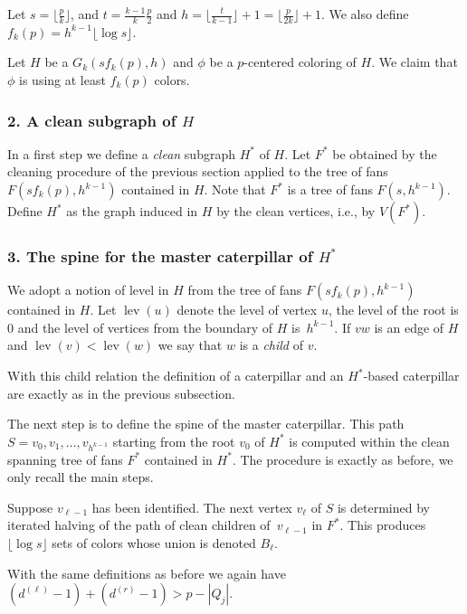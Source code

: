\documentclass[11pt]{article}
\begin{document}
\smallskip

Let $s=\lfloor \frac{p}{k} \rfloor$, and
$t =  \frac{k-1}{k}\frac{p}{2} $ and $h = \lfloor \frac{t}{k-1} \rfloor +1 =
\lfloor \frac{p}{2k} \rfloor +1$.  We also define 
$f_k(p) = h^{k-1} \lfloor\log s\rfloor$.

Let $H$ be a $G_k(s f_k(p), h)$ and $\phi$ be a $p$-centered coloring of
$H$. We claim that $\phi$ is using at least $f_k(p)$ colors.

\subsubsection*{2.  A clean subgraph of $H$}\hfill


In a first step we define a \emph{clean} subgraph $H^*$ of $H$. Let $F^*$ be
obtained by the cleaning procedure of the previous section applied to the tree
of fans $F(s f_k(p),h^{k-1})$ contained in $H$.  Note that $F^*$ is a
tree of fans $F(s,h^{k-1})$. Define $H^*$ as the graph
induced in $H$ by the clean vertices, i.e., by $V(F^*)$.


\subsubsection*{3.  The spine for the master caterpillar of $H^*$}\hfill

We adopt a notion of level in $H$ from the tree of fans
$F(s f_k(p),h^{k-1})$ contained in $H$. Let $\operatorname{lev}(u)$ denote the level of
vertex $u$, the level of the root is 0 and the level of vertices from the
boundary of $H$ is~$h^{k-1}$. If $vw$ is an edge of $H$ and
$\operatorname{lev}(v) < \operatorname{lev}(w)$ we say that $w$ is a
\emph{child} of $v$.

With this child relation the definition of a caterpillar and an $H^*$-based
caterpillar are exactly as in the previous subsection.

The next step is to define the spine of the master caterpillar.
This path $S=v_0,v_1,\ldots,v_{h^{k-1}}$ starting from the root $v_0$ of $H^*$
is computed within the clean spanning tree of fans $F^*$
contained in $H^*$.
The procedure is exactly as before, we only recall the main steps.

Suppose $v_{\ell-1}$ has been identified.
The next vertex $v_{\ell}$ of $S$ is determined by iterated halving of the path of
clean children of~$v_{\ell-1}$ in $F^*$. This produces $\lfloor\log s\rfloor$ sets of colors whose
union is denoted $B_\ell$.

With the same definitions as before we again have
$(d^{(\ell)}-1)+(d^{(r)}-1) > p - |Q_j|$. 
\end{document}
